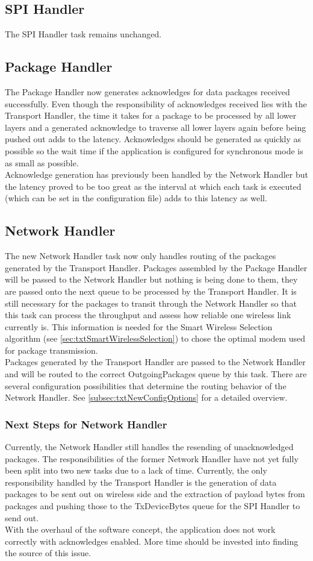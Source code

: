 \subsection{SPI Handler}
The SPI Handler task remains unchanged.
%
\subsection{Package Handler}
The Package Handler now generates acknowledges for data packages received successfully. Even though the responsibility of acknowledges received lies with the Transport Handler, the time it takes for a package to be processed by all lower layers and a generated acknowledge to traverse all lower layers again before being pushed out adds to the latency. Acknowledges should be generated as quickly as possible so the wait time if the application is configured for synchronous mode is as small as possible.\\
Acknowledge generation has previously been handled by the Network Handler but the latency proved to be too great as the interval at which each task is executed (which can be set in the configuration file) adds to this latency as well.
%
\subsection{Network Handler}
The new Network Handler task now only handles routing of the packages generated by the Transport Handler. Packages assembled by the Package Handler will be passed to the Network Handler but nothing is being done to them, they are passed onto the next queue to be processed by the Transport Handler. It is still necessary for the packages to transit through the Network Handler so that this task can process the throughput and assess how reliable one wireless link currently is. This information is needed for the Smart Wireless Selection algorithm (see \autoref{sec:txtSmartWirelessSelection}) to chose the optimal modem used for package transmission.\\
Packages generated by the Transport Handler are passed to the Network Handler and will be routed to the correct OutgoingPackages queue by this task. There are several configuration possibilities that determine the routing behavior of the Network Handler. See \autoref{subsec:txtNewConfigOptions} for a detailed overview.
\subsubsection{Next Steps for Network Handler}
Currently, the Network Handler still handles the resending of unacknowledged packages. The responsibilities of the former Network Handler have not yet fully been split into two new tasks due to a lack of time. Currently, the only responsibility handled by the Transport Handler is the generation of data packages to be sent out on wireless side and the extraction of payload bytes from packages and pushing those to the TxDeviceBytes queue for the SPI Handler to send out.\\
With the overhaul of the software concept, the application does not work correctly with acknowledges enabled. More time should be invested into finding the source of this issue.
%
%
